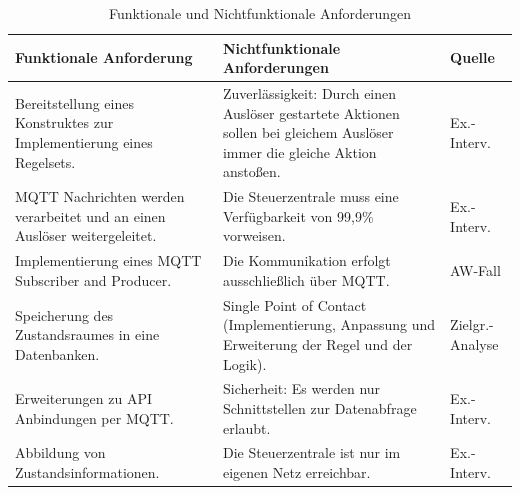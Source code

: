     \begin{table}[hbt!]
        \begin{center}
            \begin{tabular}{| p{7.0cm} | p{7.0cm} | p{1.4cm} | }
                \hline
                   \textbf{Funktionale Anforderung} & \textbf{Nichtfunktionale Anforderungen} & \textbf{Quelle} \\
                \hline
                    Bereitstellung eines Konstruktes zur Implementierung eines Regelsets. & Zuverlässigkeit: Durch einen Auslöser gestartete Aktionen sollen bei gleichem Auslöser immer die gleiche Aktion anstoßen. & Ex.-Interv. \\ 
                \hline
                    MQTT Nachrichten werden verarbeitet und an einen Auslöser weitergeleitet. & Die Steuerzentrale muss eine Verfügbarkeit von 99,9\% vorweisen. & Ex.-Interv. \\ 
                \hline
                    Implementierung eines MQTT Subscriber and Producer. & Die Kommunikation erfolgt ausschließlich über MQTT. & AW-Fall \\ 
                \hline
                    Speicherung des Zustandsraumes in eine Datenbanken. & Single Point of Contact (Implementierung, Anpassung und Erweiterung der Regel und der Logik). & Zielgr.-Analyse \\
                \hline
                    Erweiterungen zu API Anbindungen per MQTT. & Sicherheit: Es werden nur Schnittstellen zur Datenabfrage erlaubt. & Ex.-Interv. \\ 
                \hline
                    Abbildung von Zustandsinformationen. & Die Steuerzentrale ist nur im eigenen Netz erreichbar. & Ex.-Interv. \\
                \hline
            \end{tabular}
        \end{center}
        \caption{Funktionale und Nichtfunktionale Anforderungen}
        \label{tab:FAandNFA}
    \end{table}

